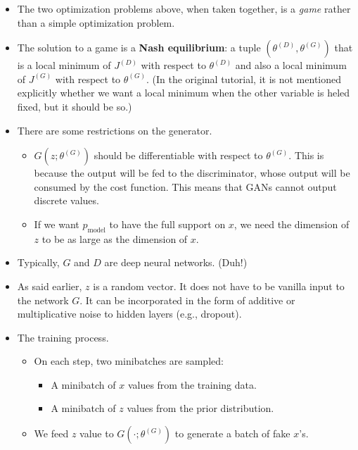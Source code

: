 \documentclass[10pt]{article}
\begin{document}
\begin{itemize}
    \item The two optimization problems above, when taken together, is a \emph{game} rather than a simple optimization problem.

    \item The solution to a game is a \textbf{Nash equilibrium}: a tuple $(\theta^{(D)}, \theta^{(G)})$ that is a local minimum of $J^{(D)}$ with respect to $\theta^{(D)}$ and also a local minimum of $J^{(G)}$ with respect to $\theta^{(G)}$. (In the original tutorial, it is not mentioned explicitly whether we want a local minimum when the other variable is heled fixed, but it should be so.)

    \item There are some restrictions on the generator.
    \begin{itemize}
      \item $G(z;\theta^{(G)})$ should be differentiable with respect to $\theta^{(G)}$. This is because the output will be fed to the discriminator, whose output will be consumed by the cost function. This means that GANs cannot output discrete values.      

      \item If we want $p_{\mathrm{model}}$ to have the full support on $x$, we need the dimension of $z$ to be as large as the dimension of $x$.      
    \end{itemize}

    \item Typically, $G$ and $D$ are deep neural networks. (Duh!)

    \item As said earlier, $z$ is a random vector. It does not have to be vanilla input to the network $G$. It can be incorporated in the form of additive or multiplicative noise to hidden layers (e.g., dropout).

    \item The training process.
    \begin{itemize}
      \item On each step, two minibatches are sampled:
      \begin{itemize}
        \item A minibatch of $x$ values from the training data.
        \item A minibatch of $z$ values from the prior distribution.
      \end{itemize}

      \item We feed $z$ value to $G(\cdot;\theta^{(G)})$ to generate a batch of fake $x$'s.


\end{itemize}
\end{itemize}
\end{document}
